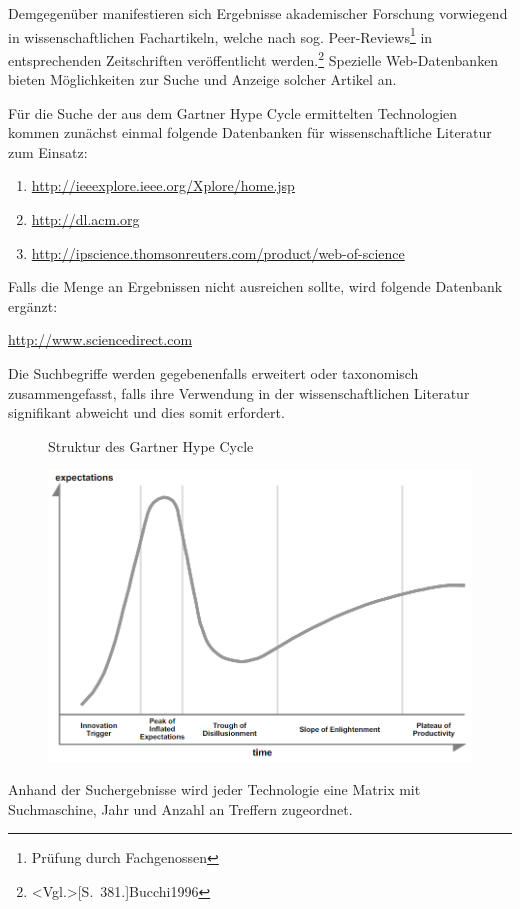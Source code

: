 Demgegenüber manifestieren sich Ergebnisse akademischer Forschung vorwiegend in wissenschaftlichen Fachartikeln, welche nach sog. \glqq Peer-Reviews\grqq \footnote{Prüfung durch Fachgenossen} in entsprechenden Zeitschriften veröffentlicht werden.\footnote{\citeNP<Vgl.>[S.~381.]{Bucchi1996}} Spezielle Web-Datenbanken bieten Möglichkeiten zur Suche und Anzeige solcher Artikel an.

Für die Suche der aus dem \glqq Gartner Hype Cycle \grqq ermittelten Technologien kommen zunächst einmal folgende Datenbanken für wissenschaftliche Literatur zum Einsatz:
\begin{enumerate}
	\item \url{http://ieeexplore.ieee.org/Xplore/home.jsp}
	\item \url{http://dl.acm.org}
	\item \url{http://ipscience.thomsonreuters.com/product/web-of-science}
\end{enumerate}

Falls die Menge an Ergebnissen nicht ausreichen sollte, wird folgende Datenbank ergänzt:

\url{http://www.sciencedirect.com}

Die Suchbegriffe werden gegebenenfalls erweitert oder taxonomisch zusammengefasst, falls ihre Verwendung in der wissenschaftlichen Literatur signifikant abweicht und dies somit erfordert.

\begin{figure}[h]
	\centering
	\caption{Struktur des \glqq Gartner Hype Cycle\grqq}
	\includegraphics[width=0.9\linewidth]{img/ghc_raw}
	\caption*{\protect\fullciteNP<Quelle:>[S.~4]{Fenn2017}}
	\label{fig:ghc_raw}
\end{figure}

Anhand der Suchergebnisse wird jeder Technologie eine Matrix mit Suchmaschine, Jahr und Anzahl an Treffern zugeordnet. 


